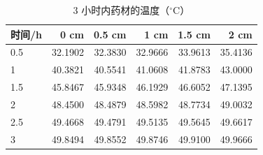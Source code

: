 \begin{table}[H]
  \centering
  \caption{3 小时内药材的温度（$^\circ$C）}
  \label{tab:p2T}
  \footnotesize
  \begin{tabular}{@{}lrrrrr@{}}
    \toprule
    时间/h & 0 cm & 0.5 cm & 1 cm & 1.5 cm & 2 cm \\
    \midrule
    0.5 & 32.1902 & 32.3830 & 32.9666 & 33.9613 & 35.4136 \\
    1 & 40.3821 & 40.5541 & 41.0608 & 41.8783 & 43.0000 \\
    1.5 & 45.8467 & 45.9348 & 46.1929 & 46.6052 & 47.1395 \\
    2 & 48.4500 & 48.4879 & 48.5982 & 48.7734 & 49.0032 \\
    2.5 & 49.4668 & 49.4791 & 49.5135 & 49.5645 & 49.6617 \\
    3 & 49.8494 & 49.8552 & 49.8746 & 49.9100 & 49.9666 \\
    \bottomrule
  \end{tabular}
\end{table}
